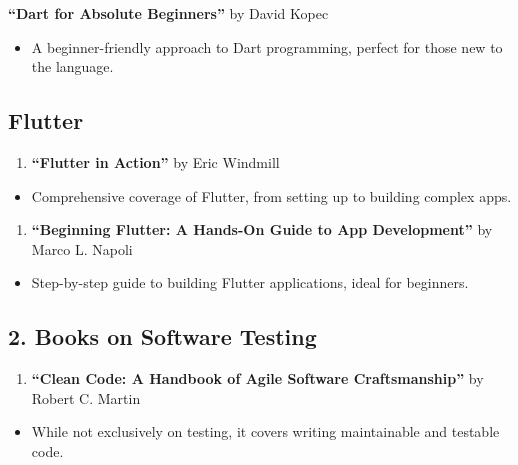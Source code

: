 \documentclass[
]{article}
\providecommand{\tightlist}{%
  \setlength{\itemsep}{0pt}\setlength{\parskip}{0pt}}
\begin{document}
\textbf{``Dart for Absolute Beginners''} by David Kopec

\begin{itemize}
\tightlist
\item
  A beginner-friendly approach to Dart programming, perfect for those
  new to the language.
\end{itemize}

\subsection{Flutter}\label{flutter}

\begin{enumerate}
\def\labelenumi{\arabic{enumi}.}
\tightlist
\item
  \textbf{``Flutter in Action''} by Eric Windmill
\end{enumerate}

\begin{itemize}
\tightlist
\item
  Comprehensive coverage of Flutter, from setting up to building complex
  apps.
\end{itemize}

\begin{enumerate}
\def\labelenumi{\arabic{enumi}.}
\setcounter{enumi}{1}
\tightlist
\item
  \textbf{``Beginning Flutter: A Hands-On Guide to App Development''} by
  Marco L. Napoli
\end{enumerate}

\begin{itemize}
\tightlist
\item
  Step-by-step guide to building Flutter applications, ideal for
  beginners.
\end{itemize}

\subsection{2. Books on Software
Testing}\label{books-on-software-testing}

\begin{enumerate}
\def\labelenumi{\arabic{enumi}.}
\tightlist
\item
  \textbf{``Clean Code: A Handbook of Agile Software Craftsmanship''} by
  Robert C. Martin
\end{enumerate}

\begin{itemize}
\tightlist
\item
  While not exclusively on testing, it covers writing maintainable and
  testable code.
\end{itemize}
\end{document}
